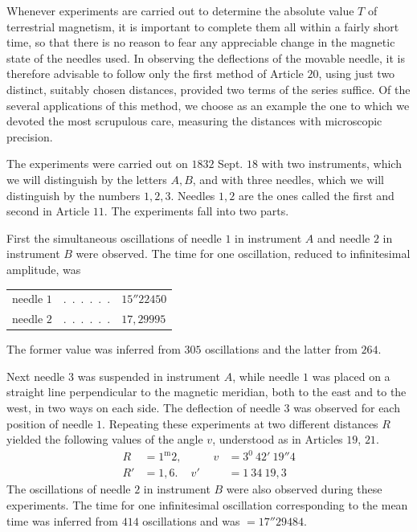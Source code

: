 Whenever experiments are carried out to determine the absolute value $T$ of terrestrial magnetism, it is important to complete them all within a fairly short time, so that there is no reason to fear any appreciable change in the magnetic state of the needles used. In observing the deflections of the movable needle, it is therefore advisable to follow only the first method of Article $20$, using just two distinct, suitably chosen distances, provided two terms of the series suffice. Of the several applications of this method, we choose as an example the one to which we devoted the most scrupulous care, measuring the distances with microscopic precision.

The experiments were carried out on $1832$ Sept. $18$ with two instruments, which we will distinguish by the letters $A,B$, and with three needles, which we will distinguish by the numbers $1,2,3$. Needles $1,2$ are the ones called the first and second in Article $11$. The experiments fall into two parts.

First the simultaneous oscillations of needle $1$ in instrument $A$ and needle $2$ in instrument $B$ were observed. The time for one oscillation, reduced to infinitesimal amplitude, was
\begin{center}
\begin{tabular}{lcl}
needle $1$&.\ .\ .\ .\ .\ .&$15''22450$\\
needle $2$&.\ .\ .\ .\ .\ .&$17{,}29995$
\end{tabular}
\end{center}
The former value was inferred from $305$ oscillations and the latter from $264$.

Next needle $3$ was suspended in instrument $A$, while needle $1$ was placed on a straight line perpendicular to the magnetic meridian, both to the east and to the west, in two ways on each side. The deflection of needle $3$ was observed for each position of needle $1$. Repeating these experiments at two different distances $R$ yielded the following values of the angle $v$, understood as in Articles $19$, $21$.
\[
\begin{aligned}
R&=1^{\mathrm m}2,&\qquad v&=3^0\ 42'\ 19''4\\
R'&=1{,}6.&v'&=1\ 34\ 19{,}3
\end{aligned}
\]
The oscillations of needle $2$ in instrument $B$ were also observed during these experiments. The time for one infinitesimal oscillation corresponding to the mean time was inferred from $414$ oscillations and was $=17''29484$.

